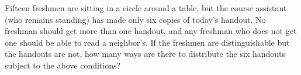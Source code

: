 Fifteen freshmen are sitting in a circle around a table, but the course assistant (who remains standing) has made only six copies of today’s handout. No freshman should get more than one handout, and any freshman who does not get one should be able to read a neighbor’s. If the freshmen are distinguishable but the handouts are not, how many ways are there to distribute the six handouts subject to the above conditions?